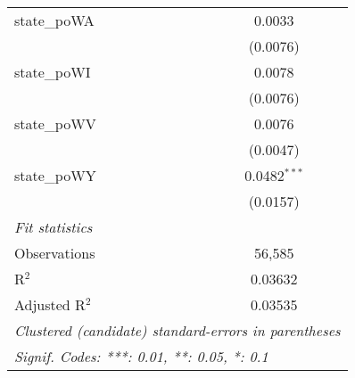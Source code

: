 \begin{tabular}{lc}
   state\_poWA                        & 0.0033\\   
                                      & (0.0076)\\   
   state\_poWI                        & 0.0078\\   
                                      & (0.0076)\\   
   state\_poWV                        & 0.0076\\   
                                      & (0.0047)\\   
   state\_poWY                        & 0.0482$^{***}$\\   
                                      & (0.0157)\\   
   \midrule
   \emph{Fit statistics}\\
   Observations                       & 56,585\\  
   R$^2$                              & 0.03632\\  
   Adjusted R$^2$                     & 0.03535\\  
   \midrule \midrule
   \multicolumn{2}{l}{\emph{Clustered (candidate) standard-errors in parentheses}}\\
   \multicolumn{2}{l}{\emph{Signif. Codes: ***: 0.01, **: 0.05, *: 0.1}}\\
\end{tabular}
\par\endgroup


